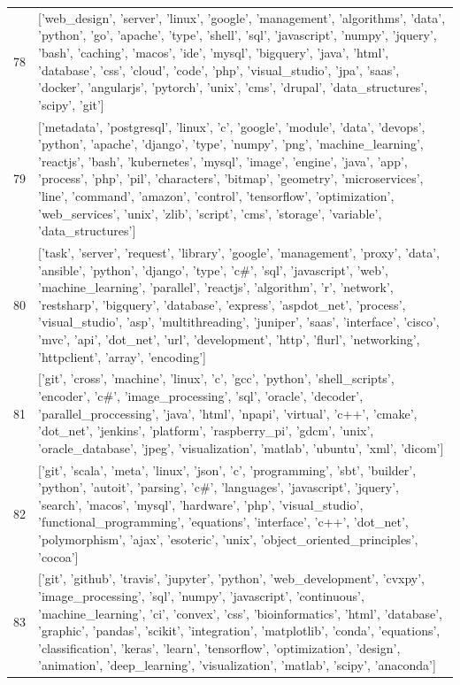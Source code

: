 \begin{center}
\begin{longtable}{|p{1.5cm}|p{12.5cm}|}
            78 & ['web\_design', 'server', 'linux', 'google', 'management', 'algorithms', 'data', 'python', 'go', 'apache', 'type', 'shell', 'sql', 'javascript', 'numpy', 'jquery', 'bash', 'caching', 'macos', 'ide', 'mysql', 'bigquery', 'java', 'html', 'database', 'css', 'cloud', 'code', 'php', 'visual\_studio', 'jpa', 'saas', 'docker', 'angularjs', 'pytorch', 'unix', 'cms', 'drupal', 'data\_structures', 'scipy', 'git']  \\ 
            79 & ['metadata', 'postgresql', 'linux', 'c', 'google', 'module', 'data', 'devops', 'python', 'apache', 'django', 'type', 'numpy', 'png', 'machine\_learning', 'reactjs', 'bash', 'kubernetes', 'mysql', 'image', 'engine', 'java', 'app', 'process', 'php', 'pil', 'characters', 'bitmap', 'geometry', 'microservices', 'line', 'command', 'amazon', 'control', 'tensorflow', 'optimization', 'web\_services', 'unix', 'zlib', 'script', 'cms', 'storage', 'variable', 'data\_structures']  \\ 
            80 & ['task', 'server', 'request', 'library', 'google', 'management', 'proxy', 'data', 'ansible', 'python', 'django', 'type', 'c\#', 'sql', 'javascript', 'web', 'machine\_learning', 'parallel', 'reactjs', 'algorithm', 'r', 'network', 'restsharp', 'bigquery', 'database', 'express', 'aspdot\_net', 'process', 'visual\_studio', 'asp', 'multithreading', 'juniper', 'saas', 'interface', 'cisco', 'mvc', 'api', 'dot\_net', 'url', 'development', 'http', 'flurl', 'networking', 'httpclient', 'array', 'encoding']  \\ 
            81 & ['git', 'cross', 'machine', 'linux', 'c', 'gcc', 'python', 'shell\_scripts', 'encoder', 'c\#', 'image\_processing', 'sql', 'oracle', 'decoder', 'parallel\_proccessing', 'java', 'html', 'npapi', 'virtual', 'c++', 'cmake', 'dot\_net', 'jenkins', 'platform', 'raspberry\_pi', 'gdcm', 'unix', 'oracle\_database', 'jpeg', 'visualization', 'matlab', 'ubuntu', 'xml', 'dicom']  \\ 
            82 & ['git', 'scala', 'meta', 'linux', 'json', 'c', 'programming', 'sbt', 'builder', 'python', 'autoit', 'parsing', 'c\#', 'languages', 'javascript', 'jquery', 'search', 'macos', 'mysql', 'hardware', 'php', 'visual\_studio', 'functional\_programming', 'equations', 'interface', 'c++', 'dot\_net', 'polymorphism', 'ajax', 'esoteric', 'unix', 'object\_oriented\_principles', 'cocoa']  \\ 
            83 & ['git', 'github', 'travis', 'jupyter', 'python', 'web\_development', 'cvxpy', 'image\_processing', 'sql', 'numpy', 'javascript', 'continuous', 'machine\_learning', 'ci', 'convex', 'css', 'bioinformatics', 'html', 'database', 'graphic', 'pandas', 'scikit', 'integration', 'matplotlib', 'conda', 'equations', 'classification', 'keras', 'learn', 'tensorflow', 'optimization', 'design', 'animation', 'deep\_learning', 'visualization', 'matlab', 'scipy', 'anaconda']  \\ 

\end{longtable}
\end{center}
